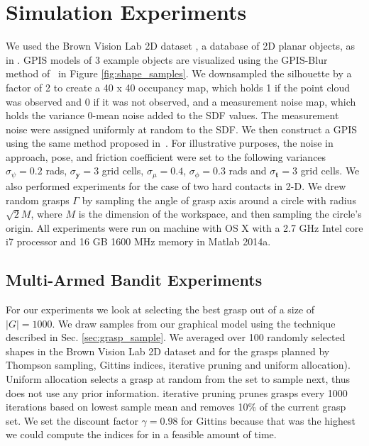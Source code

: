 \documentclass[10pt, conference]{ieeeconf}      %
\newcommand{\bt}{\mathbf{t}}
\newcommand{\by}{\mathbf{y}}
\begin{document}
\section{Simulation Experiments}
We used the Brown Vision Lab 2D dataset \cite{brown}, a database of 2D planar objects, as in \cite{christopoulos2007handling}.
GPIS models of 3 example objects are visualized using the GPIS-Blur method of~\cite{mahler2015gp} in Figure \ref{fig:shape_samples}.
We downsampled the silhouette by a factor of 2 to create a 40 x 40 occupancy map, which holds 1 if the point cloud was observed and 0 if it was not observed, and a measurement noise map, which holds the variance 0-mean noise added to the SDF values.
The measurement noise were assigned uniformly at random to the SDF.
We then construct a GPIS using the same method proposed in~\cite{mahler2015gp}.
For illustrative purposes, the noise in approach, pose, and friction coefficient were set to the following variances $\sigma_{\psi} = 0.2$ rads, $\sigma_{\by} = 3$ grid cells, $\sigma_{\mu} = 0.4$, $\sigma_{\phi} = 0.3$ rads and $\sigma_{\bt} = 3$ grid cells.
We also performed experiments for the case of two hard contacts in 2-D.
We drew random grasps $\Gamma$ by sampling the angle of grasp axis around a circle with radius $\sqrt{2} M$, where $M$ is the dimension of the workspace, and then sampling the circle's origin. All experiments were run on machine with OS X with a 2.7 GHz Intel core i7 processor and 16 GB 1600 MHz memory in Matlab 2014a.





\subsection{Multi-Armed Bandit Experiments}
For our experiments we look at selecting the best grasp out of a size of $|G| = 1000$. We draw samples from our graphical model using the technique described in Sec.  \ref{sec:grasp_sample}. We averaged over 100 randomly selected shapes in the Brown Vision Lab 2D dataset and for the grasps planned by Thompson sampling, Gittins indices, iterative pruning \cite{kehoe2012toward} and uniform allocation). Uniform allocation selects a grasp at random from the set to sample next, thus does not use any prior information. iterative pruning prunes grasps every 1000 iterations based on lowest sample mean and removes 10$\%$ of the current grasp set.  We set the discount factor $\gamma =0.98$ for Gittins because that was the highest we could compute the indices for in a feasible amount of time. 
\end{document}
